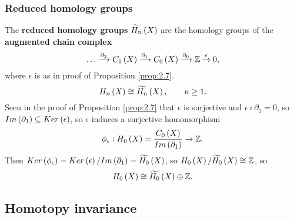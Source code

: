 \subsubsection{Reduced homology groups}

The \textbf{reduced homology groups} $ \widetilde{H_n}\br{X} $ are the homology groups of the \textbf{augmented chain complex}
$$ \dots \xrightarrow{\partial_2} C_1\br{X} \xrightarrow{\partial_1} C_0\br{X} \xrightarrow{\partial_0} \Z \xrightarrow{\epsilon} 0, $$
where $ \epsilon $ is as in proof of Proposition \ref{prop:2.7}.
$$ H_n\br{X} \cong \widetilde{H_n}\br{X}, \qquad n \ge 1. $$
Seen in the proof of Proposition \ref{prop:2.7} that $ \epsilon $ is surjective and $ \epsilon \circ \partial_1 = 0 $, so $ Im\br{\partial_1} \subseteq Ker\br{\epsilon} $, so $ \epsilon $ induces a surjective homomorphism
$$ \phi_\epsilon : H_0\br{X} = \dfrac{C_0\br{X}}{Im\br{\partial_1}} \to \Z. $$
Then $ Ker\br{\phi_\epsilon} = Ker\br{\epsilon} / Im\br{\partial_1} = \widetilde{H_0}\br{X} $, so $ H_0\br{X} / \widetilde{H_0}\br{X} \cong \Z $, so
$$ H_0\br{X} \cong \widetilde{H_0}\br{X} \oplus \Z. $$

\pagebreak

\subsection{Homotopy invariance}


